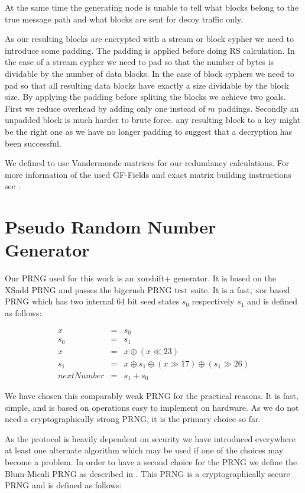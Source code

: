 \documentclass[9pt,journal,compsoc]{IEEEtran}
\begin{document}
At the same time the generating node is unable to tell what blocks belong to the true message path and what blocks are sent for decoy traffic only. 

As our resulting blocks are encrypted with a stream or block cypher we need to introduce some padding. The padding is applied before doing RS calculation. In the case of a stream cypher we need to pad so that the number of bytes is dividable by the number of data blocks. In the case of block cyphers we need to pad so that all resulting data blocks have exactly a size dividable by the block size. By applying the padding before spliting the blocks we achieve two goals. First we reduce overhead by adding only one instead of $m$ paddings. Secondly an unpadded block is much harder to brute force. any resulting block to a key might be the right one as we have no longer padding to suggest that a decryption has been successful.

We defined to use Vandermonde matrices for our redundancy calculations. For more information of the used GF-Fields and exact matrix building instructions see \cite{messageVortex}.

\section{Pseudo Random Number Generator\label{sec:prng}}
Our PRNG used for this work is an xorshift+ generator. It is based on the XSadd PRNG\cite{marsaglia2003xorshift} and passes the bigcrush PRNG test suite. It is a fast, xor based PRNG which has two internal 64 bit seed states $s_0$ respectively $s_1$ and is defined as follows:

\begin{eqnarray}
x & = & s_0\\
s_0 & = & s_1\\
x & = & x \oplus ( x \ll 23 )\\
s_1 & = & x \oplus s_1 \oplus ( x \gg 17 ) \oplus (s_1 \gg 26 )\\
nextNumber & = & s_1+s_0
\end{eqnarray}

We have chosen this comparably weak PRNG for the practical reasons. It is fast, simple, and is based on operations easy to implement on hardware. As we do not need a cryptographically strong PRNG, it is the primary choice so far. 

As the protocol is heavily dependent on security we have introduced everywhere at least one alternate algorithm which may be used if one of the choices may become a problem. In order to have a second choice for the PRNG we define the Blum-Micali PRNG as described in \cite{blum1984generate}. This PRNG is a cryptographically secure PRNG and is defined as follows:
\end{document}
